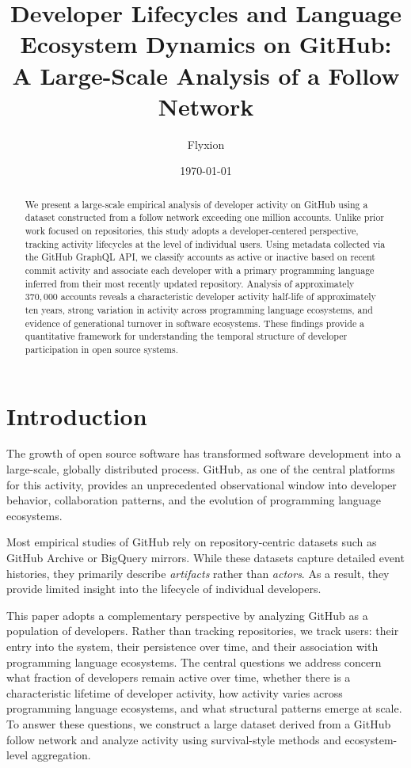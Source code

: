 \documentclass[12pt,a4paper]{article}
\title{Developer Lifecycles and Language Ecosystem Dynamics on GitHub:\\
A Large-Scale Analysis of a Follow Network}
\author{Flyxion}
\date{\today}
\begin{document}
\maketitle

\begin{abstract}
We present a large-scale empirical analysis of developer activity on GitHub using a dataset constructed from a follow network exceeding one million accounts. Unlike prior work focused on repositories, this study adopts a developer-centered perspective, tracking activity lifecycles at the level of individual users. Using metadata collected via the GitHub GraphQL API, we classify accounts as active or inactive based on recent commit activity and associate each developer with a primary programming language inferred from their most recently updated repository. Analysis of approximately $370{,}000$ accounts reveals a characteristic developer activity half-life of approximately ten years, strong variation in activity across programming language ecosystems, and evidence of generational turnover in software ecosystems. These findings provide a quantitative framework for understanding the temporal structure of developer participation in open source systems.
\end{abstract}

\section{Introduction}

The growth of open source software has transformed software development into a large-scale, globally distributed process. GitHub, as one of the central platforms for this activity, provides an unprecedented observational window into developer behavior, collaboration patterns, and the evolution of programming language ecosystems.

Most empirical studies of GitHub rely on repository-centric datasets such as GitHub Archive or BigQuery mirrors. While these datasets capture detailed event histories, they primarily describe \emph{artifacts} rather than \emph{actors}. As a result, they provide limited insight into the lifecycle of individual developers.

This paper adopts a complementary perspective by analyzing GitHub as a population of developers. Rather than tracking repositories, we track users: their entry into the system, their persistence over time, and their association with programming language ecosystems. The central questions we address concern what fraction of developers remain active over time, whether there is a characteristic lifetime of developer activity, how activity varies across programming language ecosystems, and what structural patterns emerge at scale. To answer these questions, we construct a large dataset derived from a GitHub follow network and analyze activity using survival-style methods and ecosystem-level aggregation.
\end{document}
